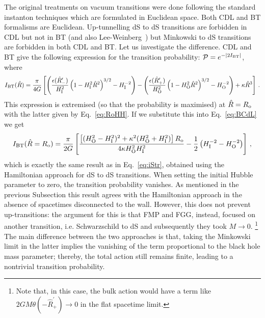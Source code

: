 \documentclass[11pt,a4paper]{article}
\begin{document}
The original treatments on vacuum transitions were done following the standard instanton techniques which are formulated in Euclidean space. Both CDL and BT formalisms are Euclidean. Up-tunnelling dS to dS transitions are forbidden in CDL but not in BT (and also Lee-Weinberg~\cite{Lee:1987qc}) but Minkowski to dS transitions are forbidden in both CDL and BT. Let us investigate the difference. CDL and BT give the following expression for the transition probability: $\mathcal{P} = e^{-|2 I_{\rm BT}|}$, where
\begin{equation}
\small{
I_{{\rm BT}} (\hat{R}) =\frac{\pi}{4G}\left[
\left(\frac{\epsilon(\hat{R}'_{-})}{H_{\rm I}^{2}}\left(1-H_{{\rm
I}}^{2}\hat{R}^{2}\right)^{3/2}-H_{{\rm
I}}^{-2}\right)-\left(\frac{\epsilon(\hat{R}'_{+})}{H_{{\rm
O}}^{2}}\left(1-H_{{\rm O}}^{2}\hat{R}^{2}\right)^{3/2}-H_{{\rm {\rm
O}}}^{-2}\right)+\kappa\hat{R}^{3}\right] \,. }\label{eq:BCdL}
\end{equation}
This expression is extremised (so that the probability is maximised)
at $\hat{R} = R_{\rm o}$ with the latter given by Eq.~\eqref{eq:RoHH}. If we substitute this into Eq.~\eqref{eq:BCdL} we get
\begin{equation}
I_{{\rm BT}} (\hat{R} = R_{\rm o}) = \frac{\pi}{2 G} \left[\frac{\left[(H_{{\rm O}}^{2}-H_{{\rm I}}^{2})^{2}+\kappa^{2}(H_{{\rm O}}^{2}+H_{{\rm I}}^{2})\right] R_{{\rm o}}}{4\kappa H_{{\rm O}}^{2}H_{{\rm I}}^{2}}-\frac{1}{2}\left(H_{{\rm I}}^{-2}-H_{{\rm O}}^{-2}\right)\right] \,, \label{eq:BCdL2}
\end{equation}
which is exactly the same result as in Eq.~\eqref{eq:iStr}, obtained using the Hamiltonian approach for dS to dS transitions. When setting the initial Hubble parameter to zero, the transition probability vanishes. As mentioned in the previous Subsection this result  agrees with the Hamiltonian approach in the absence of spacetimes disconnected to the wall. However, this does not prevent up-transitions: the argument for this is that FMP and FGG, instead, focused on another transition, i.e. Schwarzschild to dS and subsequently they took $M \rightarrow 0$. \footnote{Note that, in this case, the bulk action would have a term like $2 G M \theta(-\hat R^{\prime}_{+}) \rightarrow 0$ in the flat spacetime limit.} The main difference  between the two approaches is that, taking the Minkowski limit in the latter implies the vanishing of the term proportional to the black hole mass parameter; thereby, the total action still remains finite, leading to a nontrivial transition probability.
\end{document}
